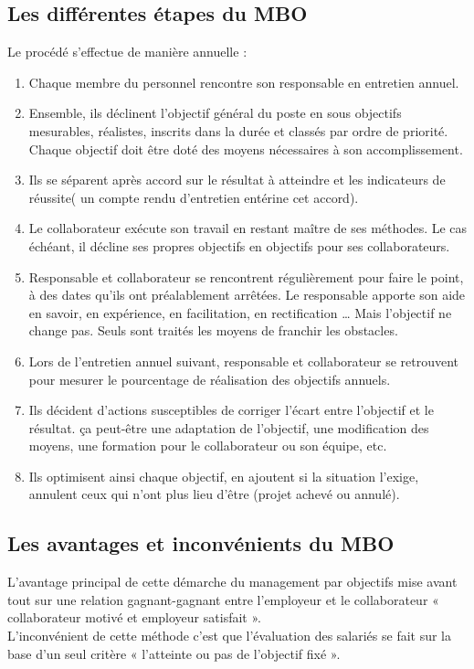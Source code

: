 \subsection{Les différentes étapes du MBO}
Le procédé s’effectue de manière annuelle :
\begin{enumerate}
\item Chaque membre du personnel rencontre son responsable en entretien annuel.
\item Ensemble, ils déclinent l’objectif général du poste en sous objectifs mesurables, réalistes, inscrits dans la durée et classés par ordre de priorité. Chaque objectif doit être doté des moyens nécessaires à son accomplissement.
\item Ils se séparent après accord sur le résultat à atteindre et les indicateurs de réussite( un compte rendu d’entretien entérine cet accord).
\item Le collaborateur exécute son travail en restant maître de ses méthodes. Le cas échéant, il décline ses propres objectifs en objectifs pour ses collaborateurs.
\item Responsable et collaborateur se rencontrent régulièrement pour faire le point, à des dates qu’ils ont préalablement arrêtées. Le responsable apporte son aide en savoir, en expérience, en facilitation, en rectification … Mais l’objectif ne change pas. Seuls sont traités les moyens de franchir les obstacles.
\item Lors de l’entretien annuel suivant, responsable et collaborateur se retrouvent pour mesurer le pourcentage de réalisation des objectifs annuels.
\item Ils décident d’actions susceptibles de corriger l’écart entre l’objectif et le résultat. ça peut-être une adaptation de l’objectif, une modification des moyens, une formation pour le collaborateur ou son équipe, etc.
\item Ils optimisent ainsi chaque objectif, en ajoutent si la situation l’exige, annulent ceux qui n’ont plus lieu d’être (projet achevé ou annulé).

\end{enumerate}

\subsection{Les avantages et inconvénients du MBO}

L’avantage principal de cette démarche du management par objectifs mise avant tout sur une relation gagnant-gagnant entre l'employeur et le collaborateur « collaborateur motivé et employeur  satisfait ».\\
L’inconvénient de cette méthode c’est que l’évaluation des salariés se fait sur la base d’un seul critère  « l’atteinte ou pas de l’objectif fixé ».


